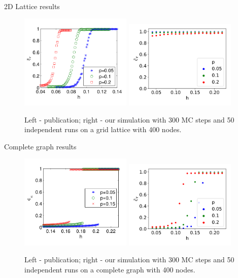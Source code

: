 \documentclass[10pt]{beamer}
\begin{document}
\begin{frame}{2D Lattice results}
	\begin{figure}
		\includegraphics[width=0.475\textwidth]{../resources/images/fig9-left.png}
		\hfill
		\includegraphics[width=0.475\textwidth]{../results/images/hp-lattice.png}
		\caption{Left - publication; right - our simulation with 300 MC steps and 50 independent runs on a grid lattice with 400 nodes.}
	\end{figure}
\end{frame}

\begin{frame}{Complete graph results}
	\begin{figure}
		\includegraphics[width=0.475\textwidth]{../resources/images/fig10-right.png}
		\hfill
		\includegraphics[width=0.475\textwidth]{../results/images/hp-complete.png}
		\caption{Left - publication; right - our simulation with 300 MC steps and 50 independent runs on a complete graph with 400 nodes.}
	\end{figure}
\end{frame}
\end{document}
